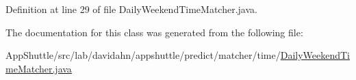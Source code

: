 \-Definition at line 29 of file \-Daily\-Weekend\-Time\-Matcher.\-java.



\-The documentation for this class was generated from the following file\-:\begin{DoxyCompactItemize}
\item 
\-App\-Shuttle/src/lab/davidahn/appshuttle/predict/matcher/time/\hyperlink{_daily_weekend_time_matcher_8java}{\-Daily\-Weekend\-Time\-Matcher.\-java}\end{DoxyCompactItemize}
